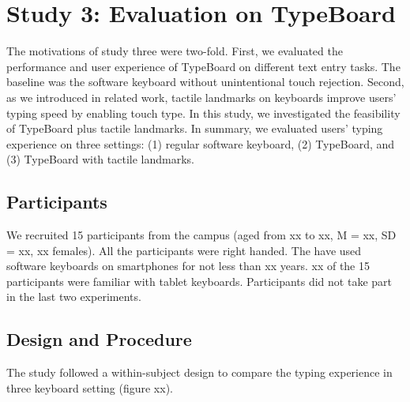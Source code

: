 \section{Study 3: Evaluation on TypeBoard}

The motivations of study three were two-fold. First, we evaluated the performance and user experience of TypeBoard on different text entry tasks. The baseline was the software keyboard without unintentional touch rejection. Second, as we introduced in related work, tactile landmarks on keyboards improve users' typing speed by enabling touch type. In this study, we investigated the feasibility of TypeBoard plus tactile landmarks. In summary, we evaluated users' typing experience on three settings: (1) regular software keyboard, (2) TypeBoard, and (3) TypeBoard with tactile landmarks.


\subsection{Participants}

We recruited 15 participants from the campus (aged from xx to xx, M = xx, SD = xx, xx females). All the participants were right handed. The have used software keyboards on smartphones for not less than xx years. xx of the 15 participants were familiar with tablet keyboards. Participants did not take part in the last two experiments.


\subsection{Design and Procedure}

The study followed a within-subject design to compare the typing experience in three keyboard setting (figure xx).

